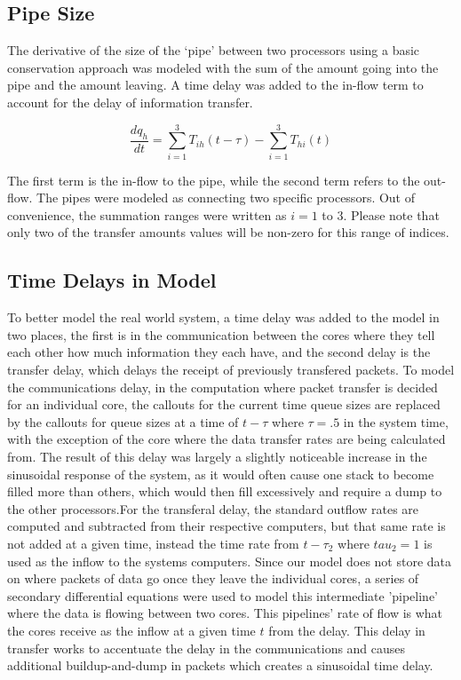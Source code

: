 \documentclass{article}
\begin{document}
\subsection{Pipe Size}

The derivative of the size of the `pipe' between two processors using a basic conservation approach was modeled with the sum of the amount going into the pipe and the amount leaving. A time delay was added to the in-flow term to account for the delay of information transfer. 

\[
\frac{dq_h}{dt} = \sum_{i=1}^{3} T_{ih}(t-\tau) - \sum_{i=1}^{3} T_{hi}(t)
\]

\noindent
The first term is the in-flow to the pipe, while the second term refers to the out-flow. The pipes were modeled as connecting two specific processors. Out of convenience, the summation ranges were written as $i=1$ to $3$. Please note that only two of the transfer amounts values will be non-zero for this range of indices.


\subsection{Time Delays in Model}\label{time delay}
To better model the real world system, a time delay was added to the model in two places, the first is in the communication between the cores where they tell each other how much information they each have, and the second delay is the transfer delay, which delays the receipt of previously transfered packets. To model the communications delay, in the computation where packet transfer is decided for an individual core, the callouts for the current time queue sizes are replaced by the callouts for queue sizes at a time of $t-\tau$ where $\tau=.5$ in the system time, with the exception of the core where the data transfer rates are being calculated from. The result of this delay was largely a slightly noticeable increase in the sinusoidal response of the system, as it would often cause one stack to become filled more than others, which would then fill excessively and require a dump to the other processors.For the transferal delay, the standard outflow rates are computed and subtracted from their respective computers, but that same rate is not added at a given time, instead the time rate from $t-\tau_2$ where $tau_2=1$ is used as the inflow to the systems computers. Since our model does not store data on where packets of data go once they leave the individual cores, a series of secondary differential equations were used to model this intermediate 'pipeline' where the data is flowing between two cores. This pipelines' rate of flow is what the cores receive as the inflow at a given time $t$ from the delay. This delay in transfer works to accentuate the delay in the communications and causes additional buildup-and-dump in packets which creates a sinusoidal time delay. 
\end{document}
